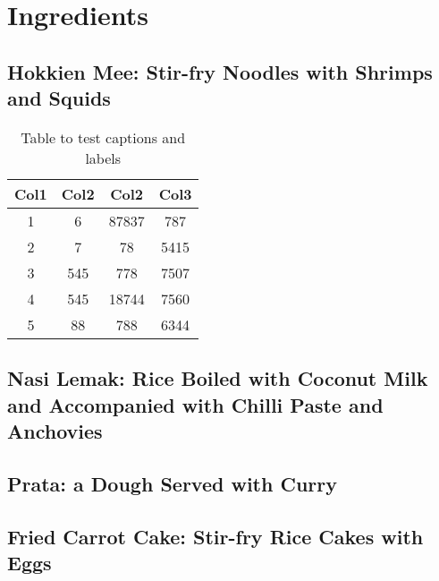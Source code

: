 \chapter{Ingredients}
\label{append:ingred}

\section{Hokkien Mee: Stir-fry Noodles with Shrimps and Squids}

\begin{table}[htbp] 
\centering
\caption{Table to test captions and labels}
\label{table:1}
\begin{tabular}{||c c c c||} 
 \hline
 Col1 & Col2 & Col2 & Col3 \\ [0.5ex] 
 \hline\hline
 1 & 6 & 87837 & 787 \\ 
 2 & 7 & 78 & 5415 \\
 3 & 545 & 778 & 7507 \\
 4 & 545 & 18744 & 7560 \\
 5 & 88 & 788 & 6344 \\ [1ex] 
 \hline
\end{tabular}
\end{table}

\lipsum[51]

\section{Nasi Lemak: Rice Boiled with Coconut Milk and Accompanied with Chilli Paste and Anchovies}

\lipsum[52]

\section{Prata: a Dough Served with Curry}

\lipsum[53]

\section{Fried Carrot Cake: Stir-fry Rice Cakes with Eggs}

\lipsum[54]

